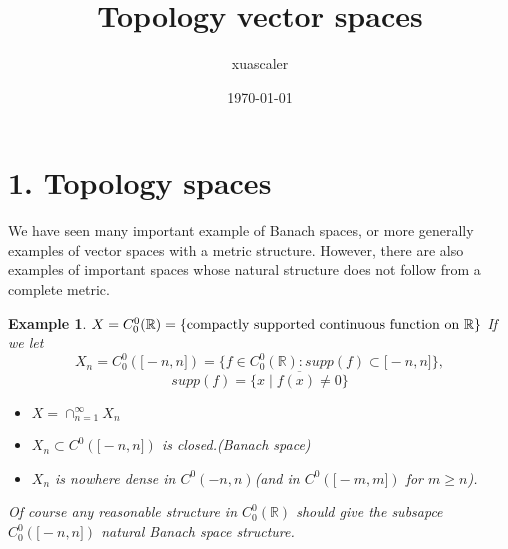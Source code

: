 \documentclass{article}
\title{Topology vector spaces}
\author{xuascaler}
\date{\today}
\newtheorem*{example}{Example}
\begin{document}
\maketitle

\section*{1. Topology spaces}
We have seen many important example of Banach spaces, 
or more generally examples of vector spaces with a metric structure.
However, there are also examples of important spaces 
whose natural structure does not follow from a complete metric.
\begin{example}
    $X = C_0^0(\mathbb{R}) = \{ \textnormal{compactly supported continuous function on } \mathbb{R}\}$
    If we let
    \[
        X_n = C_0^0(\bigl[-n, n \bigr]) = \{f \in C_0^0(\mathbb{R}): supp(f) \subset \bigl[ -n, n\bigr]\},
    \]
    \[
        supp(f)=\overline{\{x \mid f(x) \ne 0\}}
    \]
    \begin{itemize}
        \item $X = \cap_{n=1}^{\infty}{X_n}$
        \item $X_n \subset C^0(\bigl[-n, n\bigr])$ is closed.(Banach space)
        \item $X_n$ is nowhere dense in $C^0(-n, n)$(and in $C^0(\bigl[-m,m\bigr])$ for $m \ge n$).
    \end{itemize}
    Of course any reasonable structure in 
    $C_0^0(\mathbb{R})$ 
    should give the subsapce $C_0^0(\bigl[ -n, n \bigr])$ natural Banach space structure.
\end{example}
\end{document}
